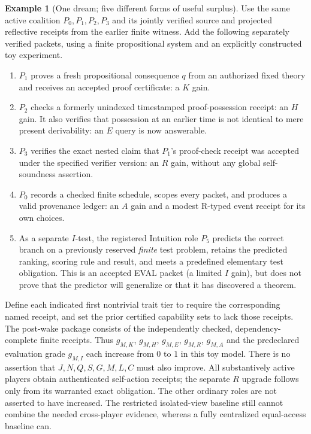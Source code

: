 \documentclass[11pt,letterpaper]{article}
\theoremstyle{definition}
\theoremstyle{plain}
\theoremstyle{definition}
\newtheorem{example}[definition]{Example}
\begin{document}
\begin{example}[One dream; five different forms of useful surplus]
Use the same active coalition $P_0,P_1,P_2,P_3$ and its jointly verified source and projected reflective receipts from the earlier finite witness. Add the following separately verified packets, using a finite propositional system and an explicitly constructed toy experiment.
\begin{enumerate}[label=(\roman*),leftmargin=*]
\item $P_1$ proves a fresh propositional consequence $q$ from an authorized fixed theory and receives an accepted proof certificate: a $K$ gain.
\item $P_2$ checks a formerly unindexed timestamped proof-possession receipt: an $H$ gain. It also verifies that possession at an earlier time is not identical to mere present derivability: an $E$ query is now answerable.
\item $P_3$ verifies the exact nested claim that $P_1$'s proof-check receipt was accepted under the specified verifier version: an $R$ gain, without any global self-soundness assertion.
\item $P_0$ records a checked finite schedule, scopes every packet, and produces a valid provenance ledger: an $A$ gain and a modest R-typed event receipt for its own choices.
\item As a separate $I$-test, the registered Intuition role $P_5$ predicts the correct branch on a previously reserved \emph{finite} test problem, retains the predicted ranking, scoring rule and result, and meets a predefined elementary test obligation. This is an accepted \textsf{EVAL} packet (a limited $I$ gain), but does not prove that the predictor will generalize or that it has discovered a theorem.
\end{enumerate}
Define each indicated first nontrivial trait tier to require the corresponding named receipt, and set the prior certified capability sets to lack those receipts. The post-wake package consists of the independently checked, dependency-complete finite receipts. Thus $g_{M,K}$, $g_{M,H}$, $g_{M,E}$, $g_{M,R}$, $g_{M,A}$ and the predeclared evaluation grade $g_{M,I}$ each increase from $0$ to $1$ in this toy model. There is no assertion that $J,N,Q,S,G,M,L,C$ must also improve. All substantively active players obtain authenticated self-action receipts; the separate $R$ upgrade follows only from its warranted exact obligation. The other ordinary roles are not asserted to have increased. The restricted isolated-view baseline still cannot combine the needed cross-player evidence, whereas a fully centralized equal-access baseline can.
\end{example}
\end{document}
